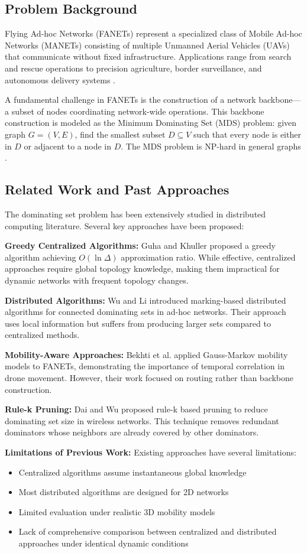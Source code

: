 \documentclass[conference]{IEEEtran}
\begin{document}
\subsection{Problem Background}
Flying Ad-hoc Networks (FANETs) represent a specialized class of Mobile Ad-hoc Networks (MANETs) consisting of multiple Unmanned Aerial Vehicles (UAVs) that communicate without fixed infrastructure. Applications range from search and rescue operations to precision agriculture, border surveillance, and autonomous delivery systems \cite{b7}.

A fundamental challenge in FANETs is the construction of a network backbone---a subset of nodes coordinating network-wide operations. This backbone construction is modeled as the Minimum Dominating Set (MDS) problem: given graph $G = (V, E)$, find the smallest subset $D \subseteq V$ such that every node is either in $D$ or adjacent to a node in $D$. The MDS problem is NP-hard in general graphs \cite{b6}.

\subsection{Related Work and Past Approaches}
The dominating set problem has been extensively studied in distributed computing literature. Several key approaches have been proposed:

\textbf{Greedy Centralized Algorithms:} Guha and Khuller \cite{b6} proposed a greedy algorithm achieving $O(\ln \Delta)$ approximation ratio. While effective, centralized approaches require global topology knowledge, making them impractical for dynamic networks with frequent topology changes.

\textbf{Distributed Algorithms:} Wu and Li \cite{b5} introduced marking-based distributed algorithms for connected dominating sets in ad-hoc networks. Their approach uses local information but suffers from producing larger sets compared to centralized methods.

\textbf{Mobility-Aware Approaches:} Bekhti et al. \cite{b4} applied Gauss-Markov mobility models to FANETs, demonstrating the importance of temporal correlation in drone movement. However, their work focused on routing rather than backbone construction.

\textbf{Rule-k Pruning:} Dai and Wu proposed rule-k based pruning to reduce dominating set size in wireless networks. This technique removes redundant dominators whose neighbors are already covered by other dominators.

\textbf{Limitations of Previous Work:} Existing approaches have several limitations:
\begin{itemize}
    \item Centralized algorithms assume instantaneous global knowledge
    \item Most distributed algorithms are designed for 2D networks
    \item Limited evaluation under realistic 3D mobility models
    \item Lack of comprehensive comparison between centralized and distributed approaches under identical dynamic conditions
\end{itemize}
\end{document}
